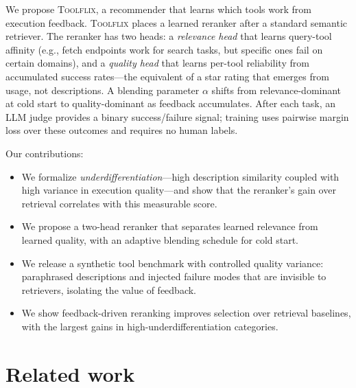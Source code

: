 \documentclass{article}
\begin{document}
We propose \textsc{Toolflix}, a recommender that learns which tools work from execution feedback. \textsc{Toolflix} places a learned reranker after a standard semantic retriever. The reranker has two heads: a \emph{relevance head} that learns query-tool affinity (e.g., fetch endpoints work for search tasks, but specific ones fail on certain domains), and a \emph{quality head} that learns per-tool reliability from accumulated success rates---the equivalent of a star rating that emerges from usage, not descriptions. A blending parameter $\alpha$ shifts from relevance-dominant at cold start to quality-dominant as feedback accumulates. After each task, an LLM judge provides a binary success/failure signal; training uses pairwise margin loss over these outcomes and requires no human labels.


Our contributions:
\begin{itemize}
    \item We formalize \emph{underdifferentiation}---high description similarity coupled with high variance in execution quality---and show that the reranker's gain over retrieval correlates with this measurable score.
    \item We propose a two-head reranker that separates learned relevance from learned quality, with an adaptive blending schedule for cold start.
    \item We release a synthetic tool benchmark with controlled quality variance: paraphrased descriptions and injected failure modes that are invisible to retrievers, isolating the value of feedback.
    \item We show feedback-driven reranking improves selection over retrieval baselines, with the largest gains in high-underdifferentiation categories.
\end{itemize}


\section{Related work}
\label{sec:related}
\end{document}

